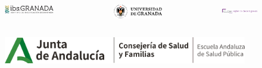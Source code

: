 \documentclass{beamer}
\begin{document}
\begin{frame}[fragile]
	
\begin{columns}
	\begin{column}{0.33\textwidth}
		\begin{figure}
			\centering
			\includegraphics[width=.9\textwidth]{logos/logo_ibs.jpg}
		\end{figure}
	\end{column}
	\begin{column}{0.33\textwidth}
		\begin{figure}
			\centering
			\includegraphics[width=.8\textwidth]{logos/logo_ugr.png}
		\end{figure}
	\end{column}
	\begin{column}{0.33\textwidth}
		\begin{figure}
			\centering
			\includegraphics[width=.9\textwidth]{logos/logo_RCG.png}
		\end{figure}
	\end{column}
\end{columns}
\begin{columns}
	\begin{column}{0.33\textwidth}
		\begin{figure}
			\centering
			\includegraphics[width=1\textwidth]{logos/logo_easp.png}
		\end{figure}
	\end{column}
	\begin{column}{0.33\textwidth}

\end{column}
\end{columns}
\end{frame}
\end{document}
